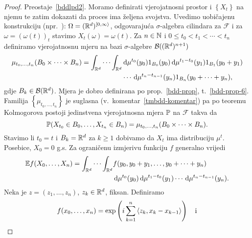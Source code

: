 \documentclass[main.tex]{subfiles}
\begin{document}
\begin{proof}
	Preostaje~\ref{bddlpd2}. Moramo definirati vjerojatnosni prostor i \( \left\{ X_t \right\} \) na njemu te zatim dokazati da proces ima željena svojstva.
	Uvedimo uobičajenu konstrukciju (npr.~\cite[str.~4]{sato}): \( \Omega = (\R^d)^{\left[0, \infty \right\rangle} \), odgovarajuća \( \sigma \)-algebra
	cilindara za \( \mathcal F \) i za \( \omega=(\omega(t))_t \) stavimo \( X_t(\omega)=\omega(t) \). Za
	\( n \in \N \) i \( 0 \le t_0 < t_1 < \cdots < t_n \) definiramo vjerojatnosnu mjeru na bazi \( \sigma \)-algebre \(\mathcal B((\R^d)^{n+1})  \)
	\begin{equation} \label{tmbdd-mjera}
		\begin{aligned}
			\mu_{t_0, \ldots, t_n}(B_0 \times \cdots \times B_n) =
			\int_{\R^d} \cdots \int_{\R^d} & \D \mu^{t_0}(y_0) 1_{B_0}(y_0)
			\D \mu^{t_1-t_0}(y_1)1_{B_1}(y_0+y_1)                           \\ &\cdots
			\D \mu^{t_n-t_{n-1}}(y_n)1_{B_n}(y_0+\cdots+y_n),
		\end{aligned}
	\end{equation}
	gdje \( B_k \in \mathcal B(\R^d) \). Mjera je dobro definirana po prop.~\ref{bdd-prop}, t.~\ref{bdd-prop-6}. Familija \( \left\{ \mu_{t_0,\ldots,t_n} \right\} \)
	je suglasna (v.\ komentar~\ref{tmbdd-komentar}) pa po teoremu Kolmogorova postoji jedinstvena vjerojatnosna mjera \( \P \) na \( \mathcal F \) takva da
	\begin{equation}
		\P(X_{t_0} \in B_0, \ldots , X_{t_n} \in B_n) = \mu_{t_0, \ldots, t_n}(B_0 \times \cdots \times B_n).
	\end{equation}
	Stavimo li \( t_0 = t \) i \( B_k = \R^d \) za \( k \ge 1 \) dobivamo da \( X_t \) ima distribuciju \( \mu^t \). Posebice, \( X_0 = 0 \) g.s. Za ograničenu izmjerivu funkciju \( f \) generalno vrijedi
	\begin{equation} \label{eq:tmbddef}
		\begin{aligned}
			\E f(X_0, \ldots, X_n) = \int_{\R^d} \cdots \int_{\R^d} & f(y_0, y_0+y_1, \ldots, y_0+\cdots+y_n)
			\\ & \D \mu^{t_0}(y_0) \D \mu^{t_1-t_0}(y_1) \cdots \D \mu^{t_n-t_{n-1}}(y_n).
		\end{aligned}
	\end{equation}
	Neka je \( z = (z_1, \ldots, z_n) \), \( z_k \in \R^d \), fiksan. Definiramo
	\begin{equation}
		\begin{aligned}
			 & f(x_0, \ldots, x_n) = \exp\left( i \sum_{k=1}^n \skp{z_k}{x_k-x_{k-1}}  \right)
			\quad \mathrm{i}                                                                              \\

\end{aligned}
\end{equation}
\end{proof}
\end{document}
